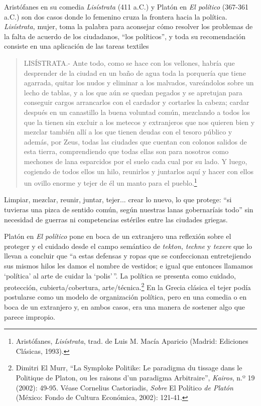 \documentclass{tufte-handout}
\begin{document}
Aristófanes en su comedia \emph{Lisístrata} (411 a.C.) y Platón en
\emph{El político} (367-361 a.C.) son dos casos donde lo femenino cruza
la frontera hacia la política. \emph{Lisístrata,} mujer, toma la palabra
para aconsejar cómo resolver los problemas de la falta de acuerdo de los
ciudadanos, ``los políticos'', y toda su recomendación consiste en una
aplicación de las tareas textiles

\begin{quote}
LISÍSTRATA.- Ante todo, como se hace con los vellones, habría que
desprender de la ciudad en un baño de agua toda la porquería que tiene
agarrada, quitar los nudos y eliminar a los malvados, vareándolos sobre
un lecho de tablas, y a los que aún se quedan pegados y se apretujan
para conseguir cargos arrancarlos con el cardador y cortarles la cabeza;
cardar después en un canastillo la buena voluntad común, mezclando a
todos los que la tienen sin excluir a los metecos y extranjeros que nos
quieren bien y mezclar también allí a los que tienen deudas con el
tesoro público y además, por Zeus, todas las ciudades que cuentan con
colonos salidos de esta tierra, comprendiendo que todas ellas son para
nosotros como mechones de lana esparcidos por el suelo cada cual por su
lado. Y luego, cogiendo de todos ellos un hilo, reunirlos y juntarlos
aquí y hacer con ellos un ovillo enorme y tejer de él un manto para el
pueblo.\footnote{Aristófanes, \emph{Lisístrata}, trad. de Luis M. Macía
  Aparicio (Madrid: Ediciones Clásicas, 1993).}
\end{quote}

Limpiar, mezclar, reunir, juntar, tejer... crear lo nuevo, lo que
protege: ``si tuvieras una pizca de sentido común, según nuestras lanas
gobernaríais todo'' sin necesidad de guerras ni competencias estériles
entre las ciudades griegas.

Platón en \emph{El político} pone en boca de un extranjero una reflexión
sobre el proteger y el cuidado desde el campo semántico de
\emph{tekton,} \emph{techne} y \emph{texere} que lo llevan a concluir
que ``a estas defensas y ropas que se confeccionan entretejiendo sus
mismos hilos les damos el nombre de vestidos; e igual que entonces
llamamos `política' al arte de cuidar la `polis'\,''. La política se
presenta como cuidado, protección, cubierta/cobertura,
arte/técnica.\footnote{Dimitri El Murr, ``La Symploke Politike: Le
  paradigma du tissage dans le Politique de Platon, ou les raisons d'un
  paradigma Arbitraire'', \emph{Kairos}, n.º 19 (2002): 49-95. Véase
  Cornelius Castoriadis, \emph{Sobre} El Político \emph{de Platón}
  (México: Fondo de Cultura Económica, 2002): 121-41.} En la Grecia
clásica el tejer podía postularse como un modelo de organización
política, pero en una comedia o en boca de un extranjero y, en ambos
casos, era una manera de sostener algo que parece impropio.
\end{document}
